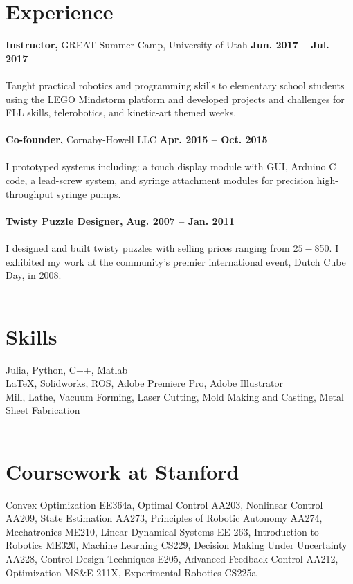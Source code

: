 \documentclass[margin,line]{res}
\begin{document}
\begin{resume}
\section{\sc Experience}
{\bf Instructor,} GREAT Summer Camp, University of Utah
\hfill {\bf Jun. 2017 – Jul. 2017}\\
\\
Taught practical robotics and programming skills to elementary school students using the LEGO Mindstorm platform and developed projects and challenges for FLL skills, telerobotics, and kinetic-art themed weeks.\\
\\
{\bf Co-founder,} Cornaby-Howell LLC
\hfill {\bf Apr. 2015 – Oct. 2015}\\
\\
I prototyped systems including: a touch display module with GUI, Arduino C code, a lead-screw system,
and syringe attachment modules for precision high-throughput syringe pumps.\\
\\
{\bf Twisty Puzzle Designer,} 
\hfill {\bf Aug. 2007 – Jan. 2011}\\
\\
I designed and built twisty puzzles with selling prices ranging from $25 - $850. I exhibited my work at
the community’s premier international event, Dutch Cube Day, in 2008.\\
\\

\section{\sc Skills}
Julia, Python, C++, Matlab\\
\LaTeX, Solidworks, ROS, Adobe Premiere Pro, Adobe Illustrator \\
Mill, Lathe, Vacuum Forming, Laser Cutting, Mold Making and Casting, Metal Sheet Fabrication\\
\\
\section{\sc Coursework at Stanford}
Convex Optimization EE364a, Optimal Control AA203, Nonlinear Control AA209, State Estimation AA273, Principles of Robotic Autonomy AA274, Mechatronics ME210, Linear Dynamical Systems EE 263, Introduction to Robotics ME320, Machine Learning CS229, Decision Making Under Uncertainty AA228, Control Design Techniques E205, Advanced Feedback Control AA212, Optimization MS\&E 211X, Experimental Robotics CS225a
\\

\end{resume}
\end{document}

